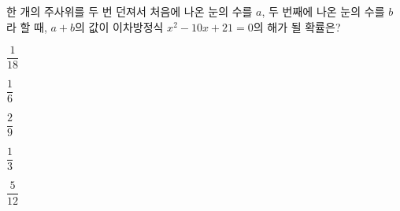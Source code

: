 한 개의 주사위를 두 번 던져서 처음에 나온 눈의 수를 $a$, 두 번째에 나온 눈의 수를 $b$라 할 때, $a+b$의 값이 이차방정식 $x^2-10x+21=0$의 해가 될 확률은?
\begin{choices32}{\rule[-3ex]{0pt}{8ex}$\dfrac{1}{18}$}{\rule[-3ex]{0pt}{8ex}$\dfrac{1}{6}$}{\rule[-3ex]{0pt}{8ex}$\dfrac{2}{9}$}{\rule[-3ex]{0pt}{8ex}$\dfrac{1}{3}$}{\rule[-3ex]{0pt}{8ex}$\dfrac{5}{12}$}\end{choices32}
